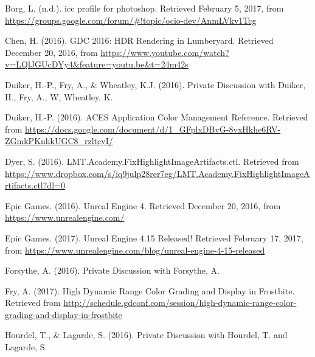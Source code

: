 \documentclass[conference]{IEEEtran}
\begin{document}
\begin{thebibliography}{1}
\renewcommand\@biblabel[1]{[Bor17]}
\bibitem{}
Borg, L. (n.d.). icc profile for photoshop. Retrieved February 5, 2017, from \url{https://groups.google.com/forum/#!topic/ocio-dev/AnmLVkv1Tcg} \vspace{2mm}

\renewcommand\@biblabel[1]{[Che16]}
\bibitem{}
Chen, H. (2016). GDC 2016: HDR Rendering in Lumberyard. Retrieved December 20, 2016, from \url{https://www.youtube.com/watch?v=LQlJGUcDYy4&feature=youtu.be&t=24m42s} \vspace{2mm}

\renewcommand\@biblabel[1]{[DFW16]}
\bibitem{}
Duiker, H.-P., Fry, A., \& Wheatley, K.J. (2016). Private Discussion with Duiker, H., Fry, A., W, Wheatley, K. \vspace{2mm}

\renewcommand\@biblabel[1]{[Dui16]}
\bibitem{}
Duiker, H.-P. (2016). ACES Application Color Management Reference. Retrieved from \url{https://docs.google.com/document/d/1_GFplxDBvG-8vxHkhe6RV-ZGmkPKnhkUGC8_rzltcyI/} \vspace{2mm}

\renewcommand\@biblabel[1]{[Dye16]}
\bibitem{}
Dyer, S. (2016). LMT.Academy.FixHighlightImageArtifacts.ctl. Retrieved from \url{https://www.dropbox.com/s/iq9julp28rer7eg/LMT.Academy.FixHighlightImageArtifacts.ctl?dl=0} \vspace{2mm}

\renewcommand\@biblabel[1]{[Epi16]}
\bibitem{}
Epic Games. (2016). Unreal Engine 4. Retrieved December 20, 2016, from \url{https://www.unrealengine.com/} \vspace{2mm}

\renewcommand\@biblabel[1]{[Epi17]}
\bibitem{}
Epic Games. (2017). Unreal Engine 4.15 Released! Retrieved February 17, 2017, from \url{https://www.unrealengine.com/blog/unreal-engine-4-15-released} \vspace{2mm}

\renewcommand\@biblabel[1]{[For16]}
\bibitem{}
Forsythe, A. (2016). Private Discussion with Forsythe, A. \vspace{2mm}

\renewcommand\@biblabel[1]{[Fry17]}
\bibitem{}
Fry, A. (2017). High Dynamic Range Color Grading and Display in Frostbite. Retrieved from \url{http://schedule.gdconf.com/session/high-dynamic-range-color-grading-and-display-in-frostbite} \vspace{2mm}

\renewcommand\@biblabel[1]{[HL16]}
\bibitem{}
Hourdel, T., \& Lagarde, S. (2016). Private Discussion with Hourdel, T. and Lagarde, S. \vspace{2mm}


\end{thebibliography}
\end{document}
